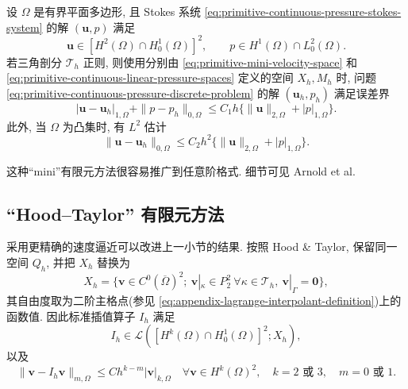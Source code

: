 \setcounter{statement}{0}
\renewcommand{\theHstatement}{theorem.\thesection.\arabic{statement}}
\begin{Theorem}\label{thm:primitive-mini-error}
设 $\Omega$ 是有界平面多边形, 且 Stokes 系统
\eqref{eq:primitive-continuous-pressure-stokes-system} 的解 $(\mathbf u,p)$ 满足
\[
\mathbf u\in[H^2(\Omega)\cap H_0^1(\Omega)]^2,
\qquad p\in H^1(\Omega)\cap L_0^2(\Omega).
\]
若三角剖分 $\mathcal T_h$ 正则, 则使用分别由
\eqref{eq:primitive-mini-velocity-space} 和
\eqref{eq:primitive-continuous-linear-pressure-spaces} 定义的空间 $X_h,M_h$ 时,
问题 \eqref{eq:primitive-continuous-pressure-discrete-problem} 的解
$(\mathbf u_h,p_h)$ 满足误差界
\begin{equation}\label{eq:primitive-mini-h1-pressure-error}
|\mathbf u-\mathbf u_h|_{1,\Omega}+\|p-p_h\|_{0,\Omega}
\leq C_1h\{\|\mathbf u\|_{2,\Omega}+|p|_{1,\Omega}\}.
\end{equation}
此外, 当 $\Omega$ 为凸集时, 有 $L^2$ 估计
\begin{equation}\label{eq:primitive-mini-l2-error}
\|\mathbf u-\mathbf u_h\|_{0,\Omega}
\leq C_2h^2\{\|\mathbf u\|_{2,\Omega}+|p|_{1,\Omega}\}.
\end{equation}
\end{Theorem}

这种“mini”有限元方法很容易推广到任意阶格式. 细节可见 Arnold et al.

\subsection{``Hood--Taylor'' 有限元方法}\label{subsec:primitive-hood-taylor}

采用更精确的速度逼近可以改进上一小节的结果. 按照 Hood \& Taylor,
保留同一空间 $Q_h$, 并把 $X_h$ 替换为
\begin{equation}\label{eq:primitive-hood-taylor-velocity-space}
X_h=\{\mathbf v\in C^0(\overline\Omega)^2;
\ \mathbf v|_\kappa\in P_2^2\ \forall\kappa\in\mathcal T_h,
\ \mathbf v|_\Gamma=\mathbf0\},
\end{equation}
其自由度取为二阶主格点(参见
\eqref{eq:appendix-lagrange-interpolant-definition})上的函数值. 因此标准插值算子
$I_h$ 满足
\[
I_h\in\mathcal L([H^k(\Omega)\cap H_0^1(\Omega)]^2;X_h),
\]
以及
\begin{equation}\label{eq:primitive-hood-taylor-interpolation-error}
\|\mathbf v-I_h\mathbf v\|_{m,\Omega}
\leq Ch^{k-m}|\mathbf v|_{k,\Omega}
\quad\forall\mathbf v\in H^k(\Omega)^2,
\quad k=2\text{ 或 }3,\quad m=0\text{ 或 }1.
\end{equation}

